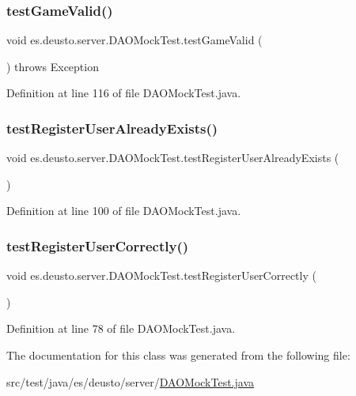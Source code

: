\subsubsection{\texorpdfstring{test\+Game\+Valid()}{testGameValid()}}
{\footnotesize\ttfamily void es.\+deusto.\+server.\+D\+A\+O\+Mock\+Test.\+test\+Game\+Valid (\begin{DoxyParamCaption}{ }\end{DoxyParamCaption}) throws Exception}



Definition at line 116 of file D\+A\+O\+Mock\+Test.\+java.

\mbox{\label{classes_1_1deusto_1_1server_1_1_d_a_o_mock_test_ad1bc82a076c6efbe4119405df120e9f7}} 
\subsubsection{\texorpdfstring{test\+Register\+User\+Already\+Exists()}{testRegisterUserAlreadyExists()}}
{\footnotesize\ttfamily void es.\+deusto.\+server.\+D\+A\+O\+Mock\+Test.\+test\+Register\+User\+Already\+Exists (\begin{DoxyParamCaption}{ }\end{DoxyParamCaption})}



Definition at line 100 of file D\+A\+O\+Mock\+Test.\+java.

\mbox{\label{classes_1_1deusto_1_1server_1_1_d_a_o_mock_test_a130e22cffc04eaf64f676f3bd990842e}} 
\subsubsection{\texorpdfstring{test\+Register\+User\+Correctly()}{testRegisterUserCorrectly()}}
{\footnotesize\ttfamily void es.\+deusto.\+server.\+D\+A\+O\+Mock\+Test.\+test\+Register\+User\+Correctly (\begin{DoxyParamCaption}{ }\end{DoxyParamCaption})}



Definition at line 78 of file D\+A\+O\+Mock\+Test.\+java.



The documentation for this class was generated from the following file\+:\begin{DoxyCompactItemize}
\item 
src/test/java/es/deusto/server/\hyperlink{_d_a_o_mock_test_8java}{D\+A\+O\+Mock\+Test.\+java}\end{DoxyCompactItemize}
